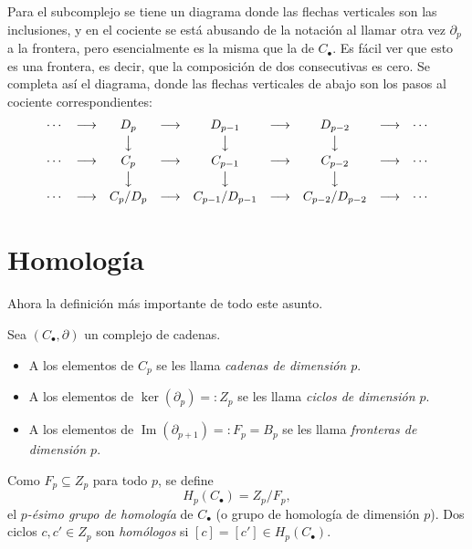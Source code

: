 \documentclass[11pt]{article}
\begin{document}
Para el subcomplejo se tiene un diagrama donde las flechas verticales son las inclusiones, y en el cociente se está abusando de la notación al llamar otra vez $\partial_p$ a la frontera, pero esencialmente es la misma que la de $C_\bullet$. Es fácil ver que esto es una frontera, es decir, que la composición de dos consecutivas es cero. Se completa así el diagrama, donde las flechas verticales de abajo son los pasos al cociente correspondientes:
\[
  \begin{array}{ccccccccc}
    \cdots & \longrightarrow & D_p & \longrightarrow & D_{p-1} & \longrightarrow & D_{p-2} & \longrightarrow & \cdots\\[2pt]
    & & \big\downarrow & & \big\downarrow & & \big\downarrow & & \\[2pt]
    \cdots & \longrightarrow & C_p & \longrightarrow & C_{p-1} & \longrightarrow & C_{p-2} & \longrightarrow & \cdots\\[2pt]
    & & \big\downarrow & & \big\downarrow & & \big\downarrow & & \\[2pt]
    \cdots & \longrightarrow & C_p/D_p & \longrightarrow & C_{p-1}/D_{p-1} & \longrightarrow & C_{p-2}/D_{p-2} & \longrightarrow & \cdots
  \end{array}
\]

\section*{Homología}

Ahora la definición más importante de todo este asunto.

\begin{defn}[Homología]\label{def:homologia}
Sea $(C_\bullet,\partial)$ un complejo de cadenas.
\begin{itemize}
  \item A los elementos de $C_p$ se les llama \emph{cadenas de dimensión $p$}.
  \item A los elementos de $\ker(\partial_p)=:Z_p$ se les llama \emph{ciclos de dimensión $p$}.
  \item A los elementos de $\operatorname{Im}(\partial_{p+1})=:F_p=B_p$ se les llama \emph{fronteras de dimensión $p$}.
\end{itemize}
Como $F_p\subseteq Z_p$ para todo $p$, se define
\[
  H_p(C_\bullet)=Z_p/F_p ,
\]
el \emph{$p$-ésimo grupo de homología} de $C_\bullet$ (o grupo de homología de dimensión $p$). Dos ciclos $c,c'\in Z_p$ son \emph{homólogos} si $[c]=[c']\in H_p(C_\bullet)$.
\end{defn}
\end{document}
